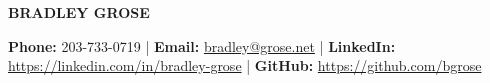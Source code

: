 \documentclass[letterpaper]{deedy-resume}
\begin{document}
\justify

\begin{center}
\Huge \textbf{BRADLEY GROSE}\\
\end{center}
\smallskip

\small
\center
\textbf{Phone:} 203-733-0719 |
\textbf{Email:} \href{mailto:bradley@grose.net}{bradley@grose.net} |
\textbf{LinkedIn:} \href{https://linkedin.com/in/bradley-grose}{https://linkedin.com/in/bradley-grose} | 
\textbf{GitHub:} \href{https://github.com/bgrose}{https://github.com/bgrose}
\smallskip



\end{document}
